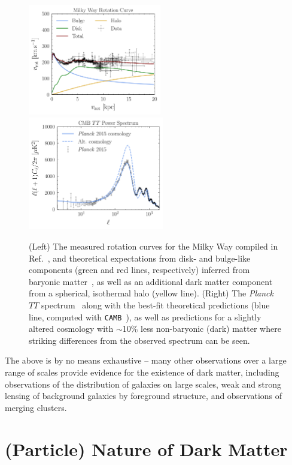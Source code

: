 \begin{figure}[htbp] 
\hspace{-0.9 cm} 
\includegraphics[width=0.5185\textwidth]{ch-intro/rotcurves.pdf}
 \includegraphics[width=0.528\textwidth]{ch-intro/cells.pdf}  
\caption{(Left) The measured rotation curves for the Milky Way compiled in Ref.~\cite{2009PASJ...61..227S}, and theoretical expectations from disk- and bulge-like components (green and red lines, respectively) inferred from baryonic matter~\cite{2009PASJ...61..227S}, as well as an additional dark matter component from a spherical, isothermal halo (yellow line). (Right) The \emph{Planck} $TT$ spectrum~\cite{Ade:2015xua} along with the best-fit theoretical predictions (blue line, computed with \texttt{CAMB}~\cite{Lewis:1999bs}), as well as predictions for a slightly altered cosmology with $\sim$10\% less non-baryonic (dark) matter where striking differences from the observed spectrum can be seen.}  
\label{fig:evidence}
\end{figure}

The above is by no means exhaustive -- many other observations over a large range of scales provide evidence for the existence of dark matter, including observations of the distribution of galaxies on large scales, weak and strong lensing of background galaxies by foreground structure, and observations of merging clusters.


\section{(Particle) Nature of Dark Matter}
\label{sec:particledm}

